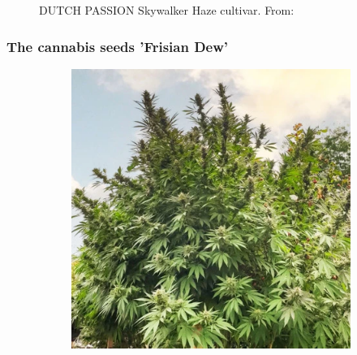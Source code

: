 \documentclass[12pt, aspectratio=1610]{beamer}
\begin{document}
\begin{frame}
\begin{figure}
\begin{subfigure}[t]{.48\textwidth}
            \end{subfigure}
            \caption{DUTCH PASSION Skywalker Haze cultivar. From: \textcite{noauthor_dutch-passion_skywalker-haze_nodate}}
        \end{figure}
    \end{frame}

    \begin{frame}
        \frametitle{The cannabis seeds 'Frisian Dew'}
        \begin{figure}
            \begin{subfigure}[t]{.48\textwidth}
                \includegraphics[width=\linewidth]{../figures/DUTCH-PASSION_Frisian-Dew_1}
            \end{subfigure}
            \hfill
            \begin{subfigure}[t]{.48\textwidth}

\end{subfigure}
\end{figure}
\end{frame}
\end{document}
